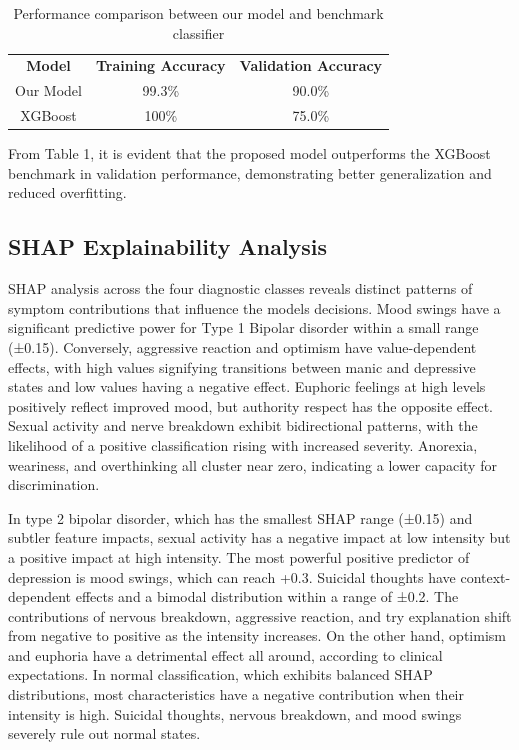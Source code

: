 \documentclass[conference]{IEEEtran}
\begin{document}
\begin{table}[htbp]
\centering
\caption{Performance comparison between our model and benchmark classifier}
\begin{tabular}{|c|c|c|}
\hline
\textbf{Model}
 & 
\textbf{Training Accuracy}
 & 
\textbf{Validation Accuracy}
 \\
Our Model
 & 
99.3\%
 & 
90.0\%
 \\
XGBoost
 & 
100\%
 & 
75.0\%
 \\

\hline
\end{tabular}
\end{table}


From Table 1, it is evident that the proposed model outperforms the XGBoost benchmark in validation performance, demonstrating better generalization and reduced overfitting.

\subsection{SHAP Explainability Analysis}

SHAP analysis across the four diagnostic classes reveals distinct patterns of symptom contributions that influence the model\textquotesingle s decisions. Mood swings have a significant predictive power for Type 1 Bipolar disorder within a small range (±0.15). Conversely, aggressive reaction and optimism have value-dependent effects, with high values signifying transitions between manic and depressive states and low values having a negative effect. Euphoric feelings at high levels positively reflect improved mood, but authority respect has the opposite effect. Sexual activity and nerve breakdown exhibit bidirectional patterns, with the likelihood of a positive classification rising with increased severity. Anorexia, weariness, and overthinking all cluster near zero, indicating a lower capacity for discrimination.

In type 2 bipolar disorder, which has the smallest SHAP range (±0.15) and subtler feature impacts, sexual activity has a negative impact at low intensity but a positive impact at high intensity. The most powerful positive predictor of depression is mood swings, which can reach +0.3. Suicidal thoughts have context-dependent effects and a bimodal distribution within a range of ±0.2. The contributions of nervous breakdown, aggressive reaction, and try explanation shift from negative to positive as the intensity increases. On the other hand, optimism and euphoria have a detrimental effect all around, according to clinical expectations. In normal classification, which exhibits balanced SHAP distributions, most characteristics have a negative contribution when their intensity is high. Suicidal thoughts, nervous breakdown, and mood swings severely rule out normal states.
\end{document}
